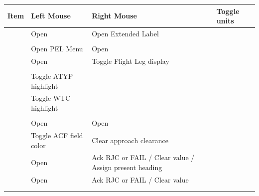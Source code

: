 \documentclass[a4paper,oneside,11pt]{memoir}
\begin{document}
\begin{longtable}{|p{}|p{}|p{}|} \hline
  \textbf{Item}         & \textbf{Left Mouse}         & \textbf{Right Mouse}                                    \endhead \hline
          & Toggle units                &                                                         \\ \hline
   & Open        & Open Extended Label                                     \\ \hline
        &                             &                                                         \\ \hline
        & Open PEL Menu               & Open                                    \\ \hline
       & Open       & Toggle Flight Leg display                               \\ \hline
       &                             &                                                         \\ \hline
       & Toggle ATYP highlight       &                                                         \\ \hline
        & Toggle WTC highlight        &                                                         \\ \hline
          &                             &                                                         \\ \hline
        & Open       & Open                                    \\ \hline
        & Toggle ACF field color      & Clear approach clearance                                \\ \hline
       & Open      & Ack RJC or FAIL / Clear value / Assign present heading  \\ \hline
        & Open       & Ack RJC or FAIL / Clear value                           \\ \hline
        &                             &                                                         \\ \hline
        &                             &                                                         \\ \hline

\end{longtable}
\end{document}

